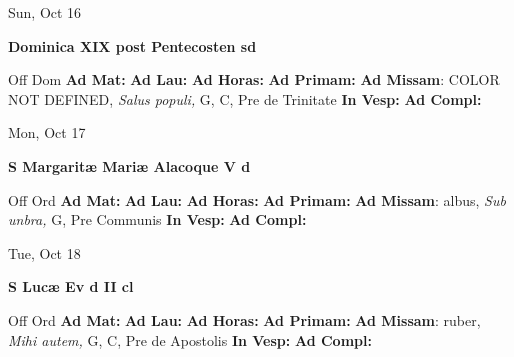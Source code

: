\documentclass[10pt]{memoir}
\begin{document}
\begin{center}
\begin{minipage}{3.5in}
\vspace{2em}
\begin{center}Sun, Oct 16
\end{center}
\textbf{ \large Dominica XIX post Pentecosten
\textnormal{\normalsize sd}}

\begin{justify}Off Dom
\textbf{Ad Mat: }
\textbf{Ad Lau: }
\textbf{Ad Horas: }
\textbf{Ad Primam: }\textbf{Ad Missam}: COLOR NOT DEFINED, \textit{Salus populi,} G, C, Pre de Trinitate
\textbf{In Vesp: }
\textbf{Ad Compl: }
\end{justify}
\end{minipage}
\end{center}

\begin{center}
\begin{minipage}{3.5in}
\vspace{2em}
\begin{center}Mon, Oct 17
\end{center}
\textbf{ \large S Margaritæ Mariæ Alacoque V
\textnormal{\normalsize d}}

\begin{justify}Off Ord
\textbf{Ad Mat: }
\textbf{Ad Lau: }
\textbf{Ad Horas: }
\textbf{Ad Primam: }\textbf{Ad Missam}: albus, \textit{Sub unbra,} G, Pre Communis
\textbf{In Vesp: }
\textbf{Ad Compl: }
\end{justify}
\end{minipage}
\end{center}

\begin{center}
\begin{minipage}{3.5in}
\vspace{2em}
\begin{center}Tue, Oct 18
\end{center}
\textbf{ \large S Lucæ Ev
\textnormal{\normalsize d II cl}}

\begin{justify}Off Ord
\textbf{Ad Mat: }
\textbf{Ad Lau: }
\textbf{Ad Horas: }
\textbf{Ad Primam: }\textbf{Ad Missam}: ruber, \textit{Mihi autem,} G, C, Pre de Apostolis
\textbf{In Vesp: }
\textbf{Ad Compl: }
\end{justify}
\end{minipage}
\end{center}
\end{document}

